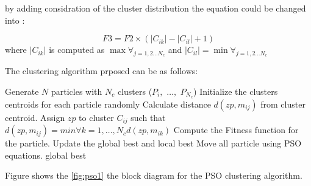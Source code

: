 \documentclass[a4paper,twoside]{article}
\begin{document}
by adding considration of the cluster distribution the equation could be changed into :

\begin{equation}
F3 =  F2\times \left(\left|{C_{ik} }\right|-\left|{C_{il} }\right|+1 \right)
\end{equation}
where $\left|{C_{ik} }\right|$ is computed as $\max\forall_{j=1,2 \dots N_c}$ and $\left|{C_{il} }\right|=\min\forall_{j=1,2 \dots N_c}$


The clustering algorithm prposed can be as follows:

\begin{algorithmic}
\STATE  Generate $N$ particles with $N_c$ clusters  ($P_i,$ $\dots,$ $P_{N_c}$)
\STATE Initialize the clusters centroids for each particle randomly
        \STATE   Calculate distance $d(zp,m_{ij})$ from cluster centroid.
        \STATE   Assign $zp$ to cluster $C_{ij}$ such that
        \STATE   $d(zp,m_{ij})=min \forall k=1,\dots,N_c {d(zp,m_{ik})}$
    \ENDFOR
    \STATE  Compute the Fitness function for the particle.
     \STATE  Update the global best and local best
     \STATE  Move all particle using PSO equations.
     \ENDFOR
  \ENDFOR
 \RETURN global best

 \end{algorithmic}

 Figure shows the \ref{fig:pso1} the block diagram for the PSO clustering algorithm.
\end{document}
